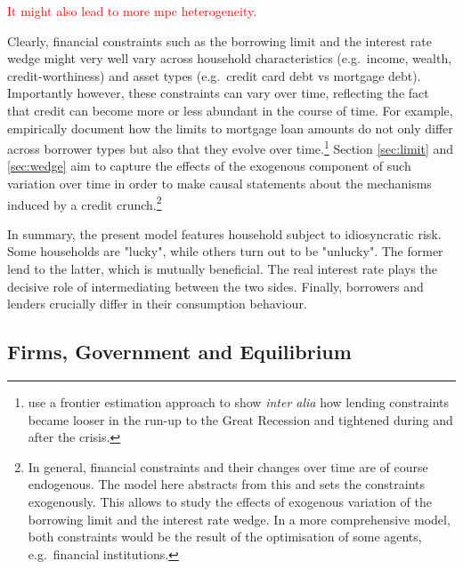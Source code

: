 \documentclass[12pt]{article} %
\numberwithin{equation}{section} %
\begin{document}
\textcolor{red}{It might also lead to more \Gls{mpc} heterogeneity.}

Clearly, financial constraints such as the borrowing limit and the interest rate wedge might very well vary across household characteristics (e.g.~income, wealth, credit-worthiness) and asset types (e.g.~credit card debt vs mortgage debt). Importantly however, these constraints can vary over time, reflecting the fact that credit can become more or less abundant in the course of time. For example, \textcite{anenberg2018} empirically document how the limits to mortgage loan amounts do not only differ across borrower types but also that they evolve over time.\footnote{\textcite{anenberg2018} use a frontier estimation approach to show \textit{inter alia} how lending constraints became looser in the run-up to the Great Recession and tightened during and after the crisis.} Section \ref{sec:limit} and \ref{sec:wedge} aim to capture the effects of the exogenous component of such variation over time in order to make causal statements about the mechanisms induced by a credit crunch.\footnote{In general, financial constraints and their changes over time are of course endogenous. The model here abstracts from this and sets the constraints exogenously. This allows to study the effects of exogenous variation of the borrowing limit and the interest rate wedge. In a more comprehensive model, both constraints would be the result of the optimisation of some agents, e.g.~financial institutions.}

In summary, the present model features household subject to idiosyncratic risk. Some households are "lucky", while others turn out to be "unlucky". The former lend to the latter, which is mutually beneficial. The real interest rate plays the decisive role of intermediating between the two sides. Finally, borrowers and lenders crucially differ in their consumption behaviour.


\subsection{Firms, Government and Equilibrium}
\label{sec:model-sectors}
\end{document}
